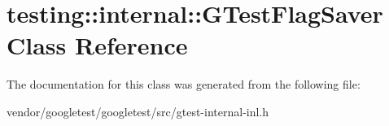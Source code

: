 \hypertarget{classtesting_1_1internal_1_1GTestFlagSaver}{}\section{testing\+:\+:internal\+:\+:G\+Test\+Flag\+Saver Class Reference}
\label{classtesting_1_1internal_1_1GTestFlagSaver}


The documentation for this class was generated from the following file\+:\begin{DoxyCompactItemize}
\item 
vendor/googletest/googletest/src/gtest-\/internal-\/inl.\+h\end{DoxyCompactItemize}
